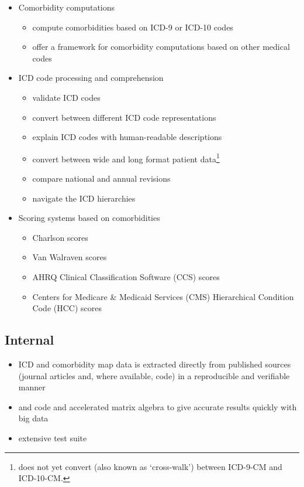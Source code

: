 \documentclass[article]{jss}
\providecommand{\tightlist}{%
  \setlength{\itemsep}{0pt}\setlength{\parskip}{0pt}}
\begin{document}
\begin{itemize}
\tightlist
\item
  Comorbidity computations

  \begin{itemize}
  \tightlist
  \item
    compute comorbidities based on ICD-9 or ICD-10 codes
  \item
    offer a framework for comorbidity computations based on other
    medical codes
  \end{itemize}
\item
  ICD code processing and comprehension

  \begin{itemize}
  \tightlist
  \item
    validate ICD codes
  \item
    convert between different ICD code representations
  \item
    explain ICD codes with human-readable descriptions
  \item
    convert between wide and long format patient data\footnote{
      does not yet convert (also known as `cross-walk') between ICD-9-CM
      and ICD-10-CM.}
  \item
    compare national and annual revisions
  \item
    navigate the ICD hierarchies
  \end{itemize}
\item
  Scoring systems based on comorbidities

  \begin{itemize}
  \tightlist
  \item
    Charlson scores
  \item
    Van Walraven scores
  \item
    AHRQ Clinical Classification Software (CCS) scores
  \item
    Centers for Medicare \& Medicaid Services (CMS) Hierarchical
    Condition Code (HCC) scores
  \end{itemize}
\end{itemize}

\subsection{Internal}\label{internal}

\begin{itemize}
\tightlist
\item
  ICD and comorbidity map data is extracted directly from published
  sources (journal articles and, where available,  code)
  in a reproducible and verifiable manner
\item
   and  code and accelerated matrix algebra to
  give accurate results quickly with big data
\item
  extensive test suite
\end{itemize}
\end{document}
